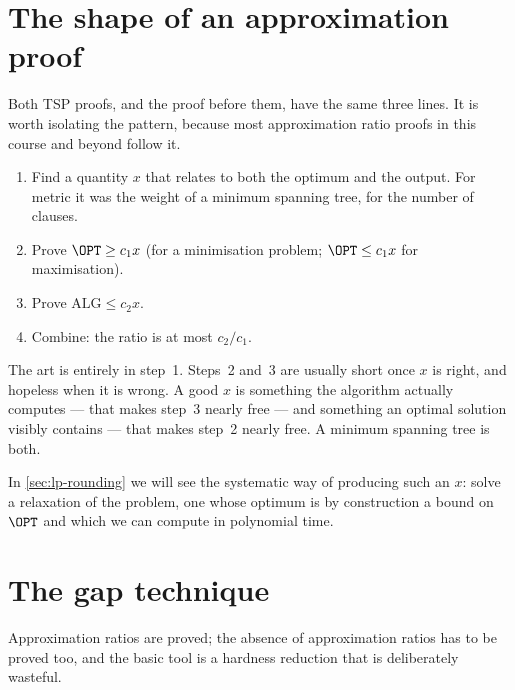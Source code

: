 \section{The shape of an approximation proof}
\label{sec:approx-proof-shape}

Both TSP proofs, and the  proof before them, have the same three
lines. It is worth isolating the pattern, because most approximation ratio
proofs in this course and beyond follow it.

\begin{enumerate}[leftmargin=*]
  \item Find a quantity $x$ that relates to both the optimum and the output.
        For metric  it was the weight of a minimum spanning tree, for
         the number of clauses.
  \item Prove $\OPT \ge c_1 x$ (for a minimisation problem; $\OPT \le c_1 x$
        for maximisation).
  \item Prove $\mathrm{ALG} \le c_2 x$.
  \item Combine: the ratio is at most $c_2/c_1$.
\end{enumerate}

The art is entirely in step~1. Steps~2 and~3 are usually short once $x$ is
right, and hopeless when it is wrong. A good $x$ is something the algorithm
actually computes --- that makes step~3 nearly free --- and something an
optimal solution visibly contains --- that makes step~2 nearly free. A minimum
spanning tree is both.

In \cref{sec:lp-rounding} we will see the systematic way of producing such an
$x$: solve a relaxation of the problem, one whose optimum is by construction a
bound on $\OPT$ and which we can compute in polynomial time.

\section{The gap technique}
\label{sec:gap-technique}

Approximation ratios are proved; the absence of approximation ratios has to be
proved too, and the basic tool is a hardness reduction that is deliberately
wasteful.


